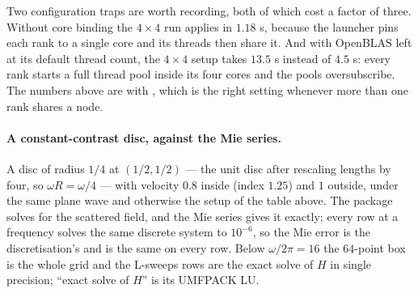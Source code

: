 \documentclass[11pt]{article}
\begin{document}
Two configuration traps are worth recording, both of which cost a factor of three. Without
core binding the $4\times4$ run applies in $1.18$ s, because the launcher pins each rank to
a single core and its threads then share it. And with OpenBLAS left at its default thread
count, the $4\times4$ setup takes $13.5$ s instead of $4.5$ s: every rank starts a full
thread pool inside its four cores and the pools oversubscribe. The numbers above are with
, which is the right setting whenever more than one rank
shares a node.

\paragraph{A constant-contrast disc, against the Mie series.} A disc of radius $1/4$ at
$(1/2,1/2)$ --- the unit disc after rescaling lengths by four, so $\omega R=\omega/4$ ---
with velocity $0.8$ inside (index $1.25$) and $1$ outside, under the same plane wave and
otherwise the setup of the table above. The package solves for the scattered field, and
the Mie series gives it exactly; every row at a frequency solves the same discrete system
to $10^{-6}$, so the Mie error is the discretisation's and is the same on every row.
Below $\omega/2\pi=16$ the $64$-point box is the whole grid and the L-sweeps rows are the
exact solve of $H$ in single precision; ``exact solve of $H$'' is its UMFPACK LU.
\end{document}
